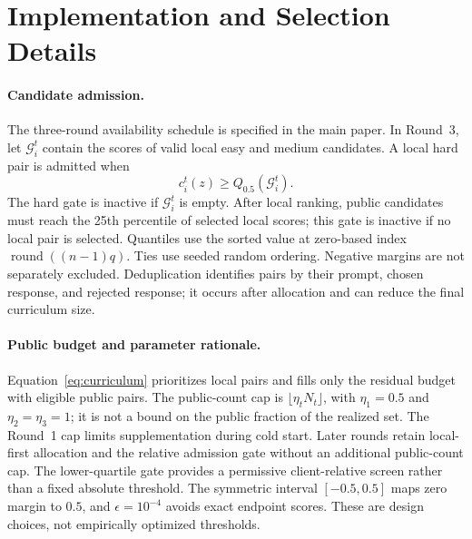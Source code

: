 
\appendix
\section{Implementation and Selection Details}
\label{app:selection-analysis}

\paragraph{Candidate admission.}
The three-round availability schedule is specified in the main paper.
In Round~3, let $\mathcal{G}_i^t$ contain the scores of valid local
easy and medium candidates. A local hard pair is admitted when
\begin{equation}\label{eq:hard_gate_app}
c_i^t(z)\geq Q_{0.5}(\mathcal{G}_i^t).
\end{equation}
The hard gate is inactive if $\mathcal{G}_i^t$ is empty.
After local ranking, public candidates must reach the 25th percentile
of selected local scores; this gate is inactive if no local pair is selected.
Quantiles use the sorted value at zero-based index
$\operatorname{round}((n-1)q)$. Ties use seeded random ordering.
Negative margins are not separately excluded. Deduplication identifies
pairs by their prompt, chosen response, and rejected response; it occurs
after allocation and can reduce the final curriculum size.

\paragraph{Public budget and parameter rationale.}
Equation~\eqref{eq:curriculum} prioritizes local pairs and fills only
the residual budget with eligible public pairs. The public-count cap
is $\lfloor\eta_tN_t\rfloor$, with $\eta_1=0.5$ and
$\eta_2=\eta_3=1$; it is not a bound on the public fraction of the
realized set. The Round~1 cap limits supplementation during cold start.
Later rounds retain local-first allocation and the relative admission
gate without an additional public-count cap. The lower-quartile gate
provides a permissive client-relative screen rather than a fixed
absolute threshold. The symmetric interval $[-0.5,0.5]$ maps zero margin
to $0.5$, and $\epsilon=10^{-4}$ avoids exact endpoint scores.
These are design choices, not empirically optimized thresholds.

